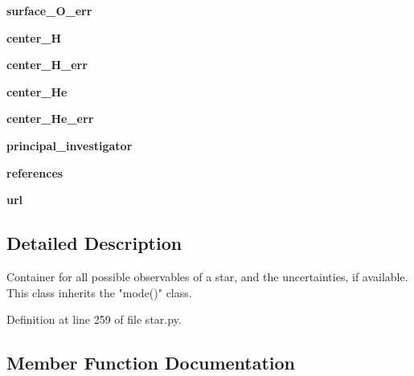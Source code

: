 \begin{DoxyCompactItemize}
\mbox{\label{classasamba_1_1star_1_1star_a505218c62a31e5bb61b2822040d87028}} 
{\bfseries surface\+\_\+\+O\+\_\+err}
\item 
\mbox{\label{classasamba_1_1star_1_1star_a8252f0a54aa01752eadcb1342a6c35cd}} 
{\bfseries center\+\_\+H}
\item 
\mbox{\label{classasamba_1_1star_1_1star_a4c8093e51c1fe37d10c9186aaa972793}} 
{\bfseries center\+\_\+\+H\+\_\+err}
\item 
\mbox{\label{classasamba_1_1star_1_1star_abc2e548e03a7224e0aed1f5cd69317be}} 
{\bfseries center\+\_\+\+He}
\item 
\mbox{\label{classasamba_1_1star_1_1star_a7515833b54158162ef38212c9babb910}} 
{\bfseries center\+\_\+\+He\+\_\+err}
\item 
\mbox{\label{classasamba_1_1star_1_1star_a89631fb850b002759c4e08b3377536a3}} 
{\bfseries principal\+\_\+investigator}
\item 
\mbox{\label{classasamba_1_1star_1_1star_a6e1ada4846d84c80523313edaa09b5bc}} 
{\bfseries references}
\item 
\mbox{\label{classasamba_1_1star_1_1star_a5d06a6f0a74d4934527b5776b6d16a60}} 
{\bfseries url}
\end{DoxyCompactItemize}


\subsection{Detailed Description}
\begin{DoxyVerb}Container for all possible observables of a star, and the uncertainties, if available. This class
inherits the "mode()" class.
\end{DoxyVerb}
 

Definition at line 259 of file star.\+py.



\subsection{Member Function Documentation}
\mbox{\label{classasamba_1_1star_1_1star_a388403867f4905df1f6c983131535379}} 
